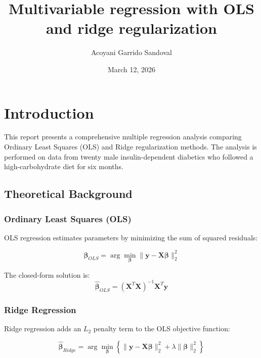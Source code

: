 \documentclass{article}
\begin{document}
\title {Multivariable regression with OLS and ridge regularization}
\author {Acoyani Garrido Sandoval}
\date {March 12, 2026}
\maketitle

\section{Introduction}

This report presents a comprehensive multiple regression analysis comparing Ordinary Least Squares (OLS) and Ridge regularization methods. The analysis is performed on data from twenty male insulin-dependent diabetics who followed a high-carbohydrate diet for six months.

\subsection{Theoretical Background}

\subsubsection{Ordinary Least Squares (OLS)}

OLS regression estimates parameters by minimizing the sum of squared residuals:

\begin{equation}
    \hat{\boldsymbol{\beta}}_{OLS} = \arg\min_{\boldsymbol{\beta}} \|\mathbf{y} - \mathbf{X}\boldsymbol{\beta}\|_2^2
\end{equation}

The closed-form solution is:
\begin{equation}
    \hat{\boldsymbol{\beta}}_{OLS} = (\mathbf{X}^T\mathbf{X})^{-1}\mathbf{X}^T\mathbf{y}
\end{equation}

\subsubsection{Ridge Regression}

Ridge regression adds an $L_2$ penalty term to the OLS objective function:

\begin{equation}
    \hat{\boldsymbol{\beta}}_{Ridge} = \arg\min_{\boldsymbol{\beta}} \left\{ \|\mathbf{y} - \mathbf{X}\boldsymbol{\beta}\|_2^2 + \lambda\|\boldsymbol{\beta}\|_2^2 \right\}
\end{equation}
\end{document}
